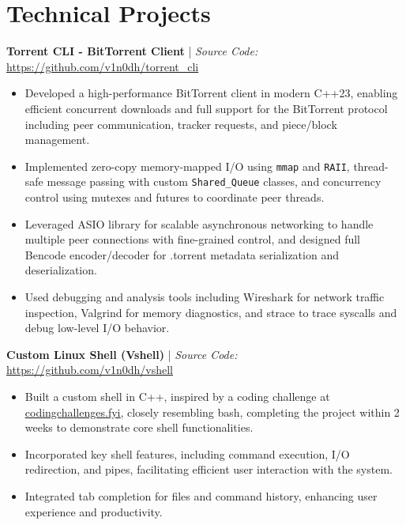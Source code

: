 \documentclass[10pt, letterpad, sans]{extarticle}
\newcommand{\projsection}[2] {
	\raggedright{\normalsize\bfseries{#1}} | {\small \textit{Source Code:} \hspace{0.1em} \href{#2}{#2}}
}
\begin{document}
\section{Technical Projects}
\projsection
{Torrent CLI - BitTorrent Client}
{https://github.com/v1n0dh/torrent\_cli}
\begin{itemize}[leftmargin=6mm]
	\item{Developed a high-performance BitTorrent client in modern C++23, enabling efficient concurrent downloads and full support for the BitTorrent protocol including peer communication, tracker requests, and piece/block management.}
	\item{Implemented zero-copy memory-mapped I/O using \texttt{mmap} and \texttt{RAII}, thread-safe message passing with custom \texttt{Shared\_Queue} classes, and concurrency control using mutexes and futures to coordinate peer threads.}
	\item{Leveraged ASIO library for scalable asynchronous networking to handle multiple peer connections with fine-grained control, and designed full Bencode encoder/decoder for .torrent metadata serialization and deserialization.}
	\item{Used debugging and analysis tools including Wireshark for network traffic inspection, Valgrind for memory diagnostics, and strace to trace syscalls and debug low-level I/O behavior.}
\end{itemize}

\vspace*{0.5em}
\projsection
{Custom Linux Shell (Vshell)}
{https://github.com/v1n0dh/vshell}
\begin{itemize}[leftmargin=6mm]
	\item{Built a custom shell in C++, inspired by a coding challenge at \href{https://codingchallenges.fyi/challenges/challenge-shell}{\underline {codingchallenges.fyi}}, closely resembling bash, completing the project within 2 weeks to demonstrate core shell functionalities.}
	\item{Incorporated key shell features, including command execution, I/O redirection, and pipes, facilitating efficient user interaction with the system.}
	\item{Integrated tab completion for files and command history, enhancing user experience and productivity.}
\end{itemize}
\end{document}
